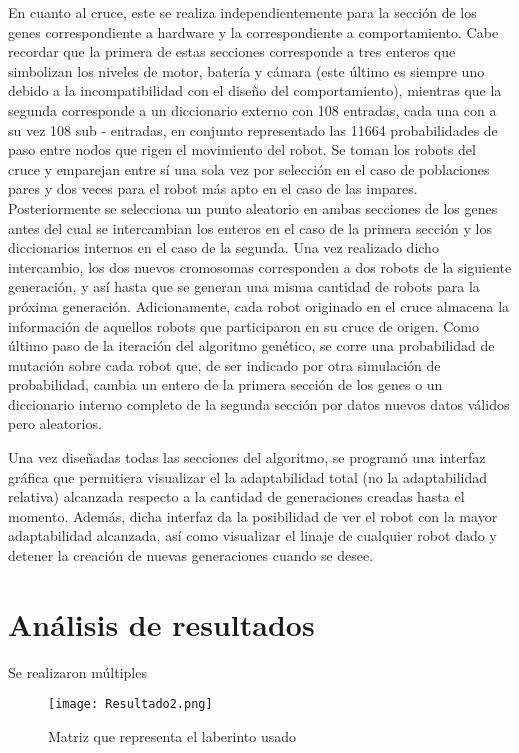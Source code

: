 \documentclass[conference]{IEEEtran}
\begin{document}
En cuanto al cruce, este se realiza independientemente para la sección de los genes correspondiente a hardware y la correspondiente a comportamiento. Cabe recordar que la primera de estas secciones corresponde a tres enteros que simbolizan los niveles de motor, batería y cámara (este último es siempre uno debido a la incompatibilidad con el diseño del comportamiento), mientras que la segunda corresponde a un diccionario externo con 108 entradas, cada una con a su vez 108 sub - entradas, en conjunto representado las 11664 probabilidades de paso entre nodos que rigen el movimiento del robot. Se toman los robots del cruce y emparejan entre sí una sola vez por selección en el caso de poblaciones pares y dos veces para el robot más apto en el caso de las impares. Posteriormente se selecciona un punto aleatorio en ambas secciones de los genes antes del cual se intercambian los enteros en el caso de la primera sección y los diccionarios internos en el caso de la segunda. Una vez realizado dicho intercambio, los dos nuevos cromosomas corresponden a dos robots de la siguiente generación, y así hasta que se generan una misma cantidad de robots para la próxima generación. Adicionamente, cada robot originado en el cruce almacena la información de aquellos robots que participaron en su cruce de origen. Como último paso de la iteración del algoritmo genético, se corre una probabilidad de mutación sobre cada robot que, de ser indicado por otra simulación de probabilidad, cambia un entero de la primera sección de los genes o un diccionario interno completo de la segunda sección por datos nuevos datos válidos pero aleatorios.

Una vez diseñadas todas las secciones del algoritmo, se programó una interfaz gráfica que permitiera visualizar el la adaptabilidad total (no la adaptabilidad relativa) alcanzada respecto a la cantidad de generaciones creadas hasta el momento. Además, dicha interfaz da la posibilidad de ver el robot con la mayor adaptabilidad alcanzada, así como visualizar el linaje de cualquier robot dado y detener la creación de nuevas generaciones cuando se desee.
\section{Análisis de resultados}

Se realizaron múltiples 

\begin{figure}[htbp]
\centerline{\texttt{[image: Resultado2.png]}}
\caption{Matriz que representa el laberinto usado}
\label{Imagen de referencia}
\end{figure}
\end{document}
